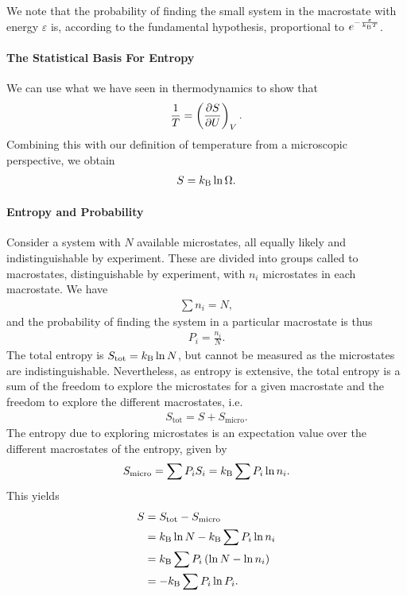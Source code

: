 We note that the probability of finding the small system in the macrostate with energy $\varepsilon$ is, according to the fundamental hypothesis, proportional to $e^{-\frac{\varepsilon}{k_{\text{B}} T}}$.

\paragraph{The Statistical Basis For Entropy}
We can use what we have seen in thermodynamics to show that
\begin{align*}
	\frac{1}{T} = \left(\pdv{S}{U}\right)_{V}.
\end{align*}
Combining this with our definition of temperature from a microscopic perspective, we obtain
\begin{align*}
	S = k_{\text{B}}\ln{\Omega}.
\end{align*}

\paragraph{Entropy and Probability}
Consider a system with $N$ available microstates, all equally likely and indistinguishable by experiment. These are divided into groups called to macrostates, distinguishable by experiment, with $n_{i}$ microstates in each macrostate. We have
\begin{align*}
	\sum n_{i} = N,
\end{align*}
and the probability of finding the system in a particular macrostate is thus
\begin{align*}
	P_{i} = \frac{n_{i}}{N}.
\end{align*}
The total entropy is $S_{\text{tot}} = k_{\text{B}}\ln{N}$, but cannot be measured as the microstates are indistinguishable. Nevertheless, as entropy is extensive, the total entropy is a sum of the freedom to explore the microstates for a given macrostate and the freedom to explore the different macrostates, i.e.
\begin{align*}
	S_{\text{tot}} = S + S_{\text{micro}}.
\end{align*}
The entropy due to exploring microstates is an expectation value over the different macrostates of the entropy, given by
\begin{align*}
	S_{\text{micro}} = \sum P_{i}S_{i} = k_{\text{B}}\sum P_{i}\ln{n_{i}}.
\end{align*}
This yields
\begin{align*}
	S &= S_{\text{tot}} - S_{\text{micro}} \\
	  &= k_{\text{B}}\ln{N} - k_{\text{B}}\sum P_{i}\ln{n_{i}} \\
	  &= k_{\text{B}}\sum P_{i}\left(\ln{N} - \ln{n_{i}}\right) \\
	  &= -k_{\text{B}}\sum P_{i}\ln{P_{i}}.
\end{align*}
